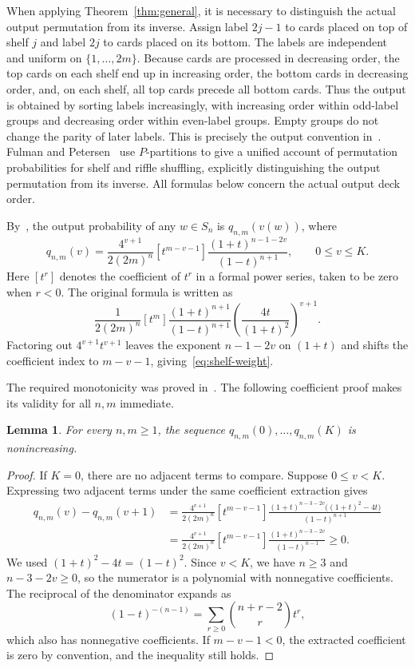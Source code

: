 \documentclass[11pt,reqno]{amsart}
\numberwithin{equation}{section}
\newtheorem{lemma}[theorem]{Lemma}
\theoremstyle{definition}
\theoremstyle{remark}
\begin{document}
When applying Theorem~\ref{thm:general}, it is necessary to distinguish the actual output permutation from its inverse. Assign label $2j-1$ to cards placed on top of shelf $j$ and label $2j$ to cards placed on its bottom. The labels are independent and uniform on $\{1,\ldots,2m\}$. Because cards are processed in decreasing order, the top cards on each shelf end up in increasing order, the bottom cards in decreasing order, and, on each shelf, all top cards precede all bottom cards. Thus the output is obtained by sorting labels increasingly, with increasing order within odd-label groups and decreasing order within even-label groups. Empty groups do not change the parity of later labels. This is precisely the output convention in~\cite[Section 3.1, Description 1]{DFH}. Fulman and Petersen~\cite{FP} use $P$-partitions to give a unified account of permutation probabilities for shelf and riffle shuffling, explicitly distinguishing the output permutation from its inverse. All formulas below concern the actual output deck order.

By~\cite[Theorem 3.1]{DFH}, the output probability of any $w\in S_n$ is $q_{n,m}(v(w))$, where
\begin{equation}\label{eq:shelf-weight}
 q_{n,m}(v)=\frac{4^{v+1}}{2(2m)^n}
 [t^{m-v-1}]\frac{(1+t)^{n-1-2v}}{(1-t)^{n+1}},
 \qquad 0\le v\le K.
\end{equation}
Here $[t^r]$ denotes the coefficient of $t^r$ in a formal power series, taken to be zero when $r<0$. The original formula is written as
\[
 \frac{1}{2(2m)^n}[t^m]
 \frac{(1+t)^{n+1}}{(1-t)^{n+1}}
 \left(\frac{4t}{(1+t)^2}\right)^{v+1}.
\]
Factoring out $4^{v+1}t^{v+1}$ leaves the exponent $n-1-2v$ on $(1+t)$ and shifts the coefficient index to $m-v-1$, giving~\eqref{eq:shelf-weight}.

The required monotonicity was proved in~\cite[Corollary 3.3]{DFH}. The following coefficient proof makes its validity for all $n,m$ immediate.

\begin{lemma}\label{lem:weight}
For every $n,m\ge1$, the sequence $q_{n,m}(0),\ldots,q_{n,m}(K)$ is nonincreasing.
\end{lemma}
\begin{proof}
If $K=0$, there are no adjacent terms to compare. Suppose $0\le v<K$. Expressing two adjacent terms under the same coefficient extraction gives
\begin{align*}
 q_{n,m}(v)-q_{n,m}(v+1)
 &=\frac{4^{v+1}}{2(2m)^n}[t^{m-v-1}]
 \frac{(1+t)^{n-3-2v}\bigl((1+t)^2-4t\bigr)}{(1-t)^{n+1}}\\
 &=\frac{4^{v+1}}{2(2m)^n}[t^{m-v-1}]
 \frac{(1+t)^{n-3-2v}}{(1-t)^{n-1}}\ge0.
\end{align*}
We used $(1+t)^2-4t=(1-t)^2$. Since $v<K$, we have $n\ge3$ and $n-3-2v\ge0$, so the numerator is a polynomial with nonnegative coefficients. The reciprocal of the denominator expands as
\[
 (1-t)^{-(n-1)}=\sum_{r\ge0}\binom{n+r-2}{r}t^r,
\]
which also has nonnegative coefficients. If $m-v-1<0$, the extracted coefficient is zero by convention, and the inequality still holds.
\end{proof}
\end{document}
